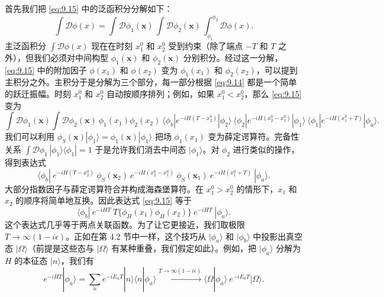 首先我们把 \eqref{eq:9.15} 中的泛函积分分解如下：
\begin{equation}
  \int \mathcal{D}\phi(x) = \int \mathcal{D}\phi_1(\mathbf{x})\,
    \int \mathcal{D}\phi_2(\mathbf{x})\, \int_{\phi_1}^{\phi_2}
    \mathcal{D}\phi(x) .
  \label{eq:9.16}
\end{equation}
主泛函积分 $\int\mathcal{D}\phi(x)$ 现在在时刻 $x^0_1$ 和 $x^0_2$ 受到约束（除了端点 $-T$ 和 $T$ 之外），但我们必须对中间构型 $\phi_1(\mathbf{x})$ 和 $\phi_2(\mathbf{x})$ 分别积分。经过这一分解，\eqref{eq:9.15} 中的附加因子 $\phi(x_1)$ 和 $\phi(x_2)$ 变为 $\phi_1(x_1)$ 和 $\phi_2(x_2)$，可以提到主积分之外。主积分于是分解为三个部分，每一部分根据 \eqref{eq:9.14} 都是一个简单的跃迁振幅。时刻 $x^0_1$ 和 $x^0_2$ 自动按顺序排列；例如，如果 $x^0_1 < x^0_2$，那么 \eqref{eq:9.15} 变为
\begin{equation}
  \int \mathcal{D}\phi_1(\mathbf{x})\int \mathcal{D}\phi_2(\mathbf{x})\
    \phi_1(x_1)\phi_2(x_2)\ \langle \phi_b|e^{-iH(T-x^0_2)}|\phi_2\rangle\
    \langle \phi_2|e^{-iH(x^0_2-x^0_1)}|\phi_1\rangle\
    \langle \phi_1|e^{-iH(x^0_1+T)}|\phi_a\rangle .
\end{equation}
我们可以利用 $\phi_S(\mathbf{x})|\phi_1\rangle = \phi_1(\mathbf{x})|\phi_1\rangle$ 把场 $\phi_1(x_1)$ 变为薛定谔算符。完备性关系 $\int\mathcal{D}\phi_1\,|\phi_1\rangle\langle\phi_1| = 1$ 于是允许我们消去中间态 $|\phi_1\rangle$。对 $\phi_2$ 进行类似的操作，得到表达式
\begin{equation}
  \langle \phi_b|\ e^{-iH(T-x^0_2)}\ \phi_S(\mathbf{x}_2)\
    e^{-iH(x^0_2-x^0_1)}\ \phi_S(\mathbf{x}_1)\
    e^{-iH(x^0_1+T)}\ |\phi_a\rangle .
\end{equation}
大部分指数因子与薛定谔算符合并构成海森堡算符。在 $x^0_1 > x^0_2$ 的情形下，$x_1$ 和 $x_2$ 的顺序将简单地互换。因此表达式 \eqref{eq:9.15} 等于
\begin{equation}
  \langle \phi_b|\ e^{-iHT}\ T\{\phi_H(x_1)\phi_H(x_2)\}\ e^{-iHT}\
    |\phi_a\rangle .
  \label{eq:9.17}
\end{equation}
这个表达式几乎等于两点关联函数。为了让它更接近，我们取极限 $T\to\infty(1-i\epsilon)$。正如在第 4.2 节中一样，这个技巧从 $|\phi_a\rangle$ 和 $|\phi_b\rangle$ 中投影出真空态 $|\Omega\rangle$（前提是这些态与 $|\Omega\rangle$ 有某种重叠，我们假定如此）。例如，把 $|\phi_a\rangle$ 分解为 $H$ 的本征态 $|n\rangle$，我们有
\begin{equation}
  e^{-iHT}|\phi_a\rangle = \sum_n e^{-iE_nT}|n\rangle\langle n|\phi_a\rangle
  \xrightarrow{T\to\infty(1-i\epsilon)}
    \langle\Omega|\phi_a\rangle\ e^{-iE_0T}|\Omega\rangle .
\end{equation}
